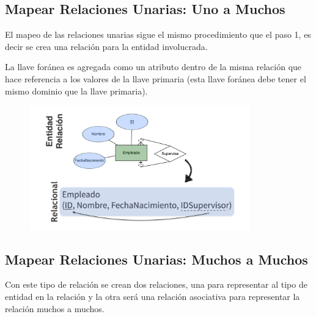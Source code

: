 \documentclass[12pt, fleqn]{report}                             %
\theoremstyle{break}                                            %
\begin{document}
            \clearpage
            \subsection{Mapear Relaciones Unarias: Uno a Muchos}

                El mapeo de las relaciones unarias sigue el mismo procedimiento que el paso 1, es decir
                se crea una relación para la entidad involucrada.

                La llave foránea es agregada como un
                atributo dentro de la misma relación que hace referencia a los valores de la llave
                primaria (esta llave foránea debe tener el mismo dominio que la llave primaria).

                \begin{figure}[h]
                    \centering
                    \includegraphics[width=0.85\textwidth]{MapeoRelacionesUnariasUnoMuchos}
                \end{figure}
                



            \clearpage
            \subsection{Mapear Relaciones Unarias: Muchos a Muchos}

                Con este tipo de relación se crean dos relaciones, una para representar al tipo de entidad en
                la relación y la otra será una relación asociativa para representar la relación muchos a muchos.
\end{document}
